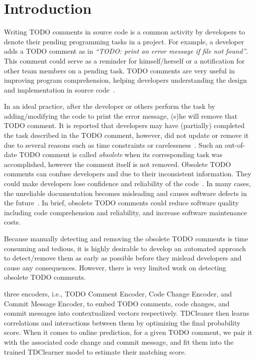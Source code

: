 \section{Introduction}
\label{intro:sec}

Writing TODO comments in source code is a common activity by
developers to denote their pending programming tasks in a project. For
example, a developer adds a TODO comment as in {\em ``TODO: print an
  error message if file not found''}. This comment could serve as a
reminder for himself/herself or a notification for other team members
on a pending task. TODO comments are very useful in improving
program comprehension, helping developers understanding the design
and implementation in source code~\cite{souza-sigdoc05,ying-msr05}.

In an ideal practice, after the developer or others perform the task
by adding/modifying the code to print the error message, (s)he will
remove that TODO comment.  It is reported that developers may have
(partially) completed the task described in the TODO comment, however,
did not update or remove it due to several reasons such as time
constraints or
carelessness~\cite{tdcleaner-fse21,wen-icpc19,icomment-sosp07}. Such
an out-of-date TODO comment is called {\em obsolete} when its
corresponding task was accomplished, however the comment itself is not
removed. Obsolete TODO comments can confuse developers and due to
their inconsistent information. They could make developers lose
confidence and reliability of the
code~\cite{tdcleaner-fse21,icomment-sosp07}. In many cases, the
unreliable documentation becomes misleading and causes software
defects in the future~\cite{icomment-sosp07,lintan-icse11}. In brief,
obsolete TODO comments could reduce software quality including code
comprehension and reliability, and increase software maintenance
costs.

Because manually detecting and removing the obsolete TODO comments is
time consuming and tedious, it is highly desirable to develop an
automated approach to detect/remove them as early as possible before
they mislead developers and cause any consequences. However, there is
very limited work on detecting obsolete TODO comments.


three encoders, i.e., TODO Comment Encoder, Code Change Encoder, and
Commit Message Encoder, to embed TODO comments, code changes, and
commit messages into contextualized vectors respectively. TDCleaner
then learns correlations and interactions between them by optimizing
the final probability score. When it comes to online prediction, for a
given TODO comment, we pair it with the associated code change and
commit message, and fit them into the trained TDClearner model to
estimate their matching score.

